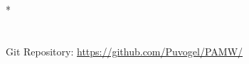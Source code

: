 *%
\appendix
 \chapter{}
 Git Repository: \href{https://github.com/Puvogel/PAMW/}{https://github.com/Puvogel/PAMW/}


